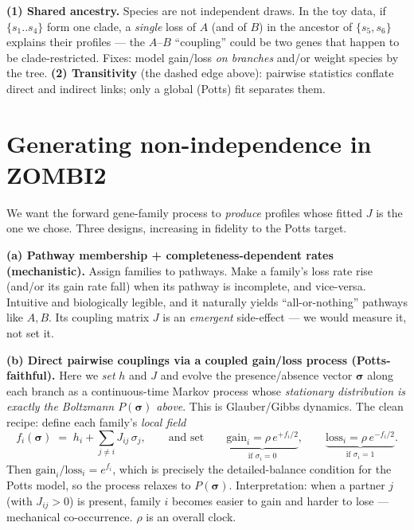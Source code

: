 \documentclass[11pt, oneside]{article}
\newcommand{\sig}{\boldsymbol{\sigma}}
\begin{document}
\begin{warningbox}
\textbf{(1) Shared ancestry.} Species are not independent draws. In the toy data, if
$\{s_1..s_4\}$ form one clade, a \emph{single} loss of $A$ (and of $B$) in the ancestor of
$\{s_5,s_6\}$ explains their profiles --- the $A$--$B$ ``coupling'' could be two genes that
happen to be clade-restricted. Fixes: model gain/loss \emph{on branches} and/or weight
species by the tree. \textbf{(2) Transitivity} (the dashed edge above): pairwise statistics
conflate direct and indirect links; only a global (Potts) fit separates them.
\end{warningbox}

\section{Generating non-independence in ZOMBI2}

We want the forward gene-family process to \emph{produce} profiles whose fitted $J$ is the one
we chose. Three designs, increasing in fidelity to the Potts target.

\textbf{(a) Pathway membership + completeness-dependent rates (mechanistic).} Assign families
to pathways. Make a family's loss rate rise (and/or its gain rate fall) when its pathway is
incomplete, and vice-versa. Intuitive and biologically legible, and it naturally yields
``all-or-nothing'' pathways like $A,B$. Its coupling matrix $J$ is an \emph{emergent}
side-effect --- we would measure it, not set it.

\textbf{(b) Direct pairwise couplings via a coupled gain/loss process (Potts-faithful).} Here
we \emph{set} $h$ and $J$ and evolve the presence/absence vector $\sig$ along each branch as a
continuous-time Markov process whose \emph{stationary distribution is exactly the Boltzmann
$P(\sig)$ above}. This is Glauber/Gibbs dynamics. The clean recipe: define each family's
\emph{local field}
\[
f_i(\sig) \;=\; h_i + \sum_{j\neq i} J_{ij}\,\sigma_j ,
\qquad\text{and set}\qquad
\underbrace{\text{gain}_i = \rho\,e^{+f_i/2}}_{\text{if } \sigma_i=0},
\qquad
\underbrace{\text{loss}_i = \rho\,e^{-f_i/2}}_{\text{if } \sigma_i=1}.
\]
Then $\text{gain}_i/\text{loss}_i = e^{f_i}$, which is precisely the detailed-balance condition
for the Potts model, so the process relaxes to $P(\sig)$. Interpretation: when a partner $j$
(with $J_{ij}>0$) is present, family $i$ becomes easier to gain and harder to lose ---
mechanical co-occurrence. $\rho$ is an overall clock.
\end{document}
